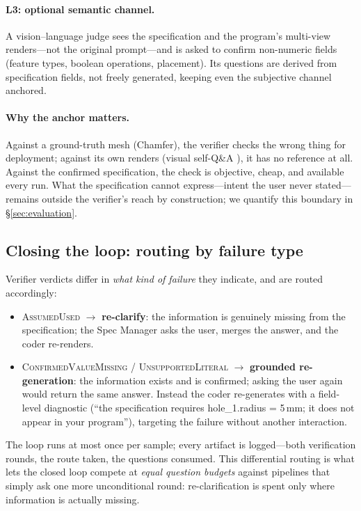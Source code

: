 \paragraph{L3: optional semantic channel.}
A vision--language judge sees the specification and the program's multi-view
renders---not the original prompt---and is asked to confirm non-numeric
fields (feature types, boolean operations, placement). Its questions are
derived from specification fields, not freely generated, keeping even the
subjective channel anchored.

\paragraph{Why the anchor matters.}
Against a ground-truth mesh (Chamfer), the verifier checks the wrong thing
for deployment; against its own renders (visual self-Q\&A
\cite{cadcodeverify,seekcad}), it has no reference at all. Against the
confirmed specification, the check is objective, cheap, and available every
run. What the specification cannot express---intent the user never
stated---remains outside the verifier's reach by construction; we quantify
this boundary in \S\ref{sec:evaluation}.

\subsection{Closing the loop: routing by failure type}\label{sec:loop}

Verifier verdicts differ in \emph{what kind of failure} they indicate, and
are routed accordingly:
\begin{itemize}
  \item \textsc{AssumedUsed} $\to$ \textbf{re-clarify}: the information is
  genuinely missing from the specification; the Spec Manager asks the user,
  merges the answer, and the coder re-renders.
  \item \textsc{ConfirmedValueMissing} / \textsc{UnsupportedLiteral} $\to$
  \textbf{grounded re-generation}: the information exists and is confirmed;
  asking the user again would return the same answer. Instead the coder
  re-generates with a field-level diagnostic (``the specification
  requires hole\_1.radius = 5\,mm; it does not appear in your program''),
  targeting the failure without another interaction.
\end{itemize}
The loop runs at most once per sample; every artifact is logged---both
verification rounds, the route taken, the questions consumed. This
differential routing is what lets the closed loop compete at
\emph{equal question budgets} against pipelines that simply ask one more
unconditional round: re-clarification is spent only where information is
actually missing.
